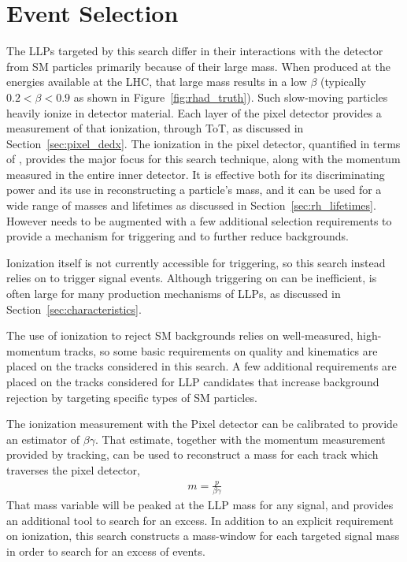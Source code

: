 \chapter{Event Selection}

\label{ch:selection}

The \acp{LLP} targeted by this search differ in their interactions with the detector from \ac{SM} particles primarily because of their large mass. 
When produced at the energies available at the \ac{LHC}, that large mass results in a low $\beta$ (typically $0.2 < \beta < 0.9$ as shown in Figure~\ref{fig:rhad_truth}). 
Such slow-moving particles heavily ionize in detector material. 
Each layer of the pixel detector provides a measurement of that ionization, through \ac{ToT}, as discussed in Section~\ref{sec:pixel_dedx}. 
The ionization in the pixel detector, quantified in terms of \dedx, provides the major focus for this search technique, along with the momentum measured in the entire inner detector.
It is effective both for its discriminating power and its use in reconstructing a particle's mass, and it can be used for a wide range of masses and lifetimes as discussed in Section~\ref{sec:rh_lifetimes}. 
However \dedx needs to be augmented with a few additional selection requirements to provide a mechanism for triggering and to further reduce backgrounds.

Ionization itself is not currently accessible for triggering, so this search instead relies on \met to trigger signal events.
Although triggering on \met can be inefficient, \met is often large for many production mechanisms of \acp{LLP}, as discussed in Section~\ref{sec:characteristics}.

The use of ionization to reject \ac{SM} backgrounds relies on well-measured, high-momentum tracks, so some basic requirements on quality and kinematics are placed on the tracks considered in this search. 
A few additional requirements are placed on the tracks considered for \ac{LLP} candidates that increase background rejection by targeting specific types of \ac{SM} particles. 

The ionization measurement with the Pixel detector can be calibrated to provide an estimator of $\beta\gamma$. That estimate, together with the momentum measurement provided by tracking, can be used to reconstruct a mass for each track which traverses the pixel detector,
\begin{align}\label{eq:mbetagamma}
m = \frac{p}{\beta\gamma}
\end{align}
That mass variable will be peaked at the \ac{LLP} mass for any signal, and provides an additional tool to search for an excess.
In addition to an explicit requirement on ionization, this search constructs a mass-window for each targeted signal mass in order to search for an excess of events.

